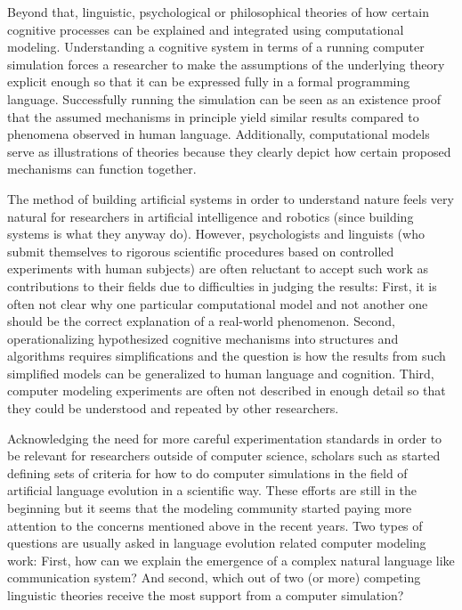Beyond that, linguistic, psychological or philosophical theories of
how certain cognitive processes can be explained and integrated using
computational modeling. Understanding a cognitive system in terms of a
running computer simulation forces a researcher to make the
assumptions of the underlying theory explicit enough so that it can be
expressed fully in a formal programming language. Successfully running
the simulation can be seen as an existence proof that the assumed
mechanisms in principle yield similar results compared to phenomena
observed in human language. Additionally, computational models serve
as illustrations of theories because they clearly depict how certain
proposed mechanisms can function together.

The method of building artificial systems in order to understand
nature feels very natural for researchers in artificial intelligence
and robotics (since building systems is what they anyway do). However,
psychologists and linguists (who submit themselves to rigorous
scientific procedures based on controlled experiments with human
subjects) are often reluctant to accept such work as contributions to
their fields due to difficulties in judging the results: First, it is
often not clear why one particular computational model and not another
one should be the correct explanation of a real-world
phenomenon. Second, operationalizing hypothesized cognitive mechanisms
into structures and algorithms requires simplifications and the
question is how the results from such simplified models can be
generalized to human language and cognition. Third, computer modeling
experiments are often not described in enough detail so that they
could be understood and repeated by other researchers.

Acknowledging the need for more careful experimentation standards in
order to be relevant for researchers outside of computer science,
scholars such as
\cite{steels06how,cangelosi02computer,schlesinger01agent-based}
started defining sets of criteria for how to do computer simulations
in the field of artificial language evolution in a scientific
way. These efforts are still in the beginning but it seems that the
modeling community started paying more attention to the concerns
mentioned above in the recent years. Two types of questions are
usually asked in language evolution related computer modeling work:
First, how can we explain the emergence of a complex natural language
like communication system? And second, which out of two (or more)
competing linguistic theories receive the most support from a computer
simulation?

